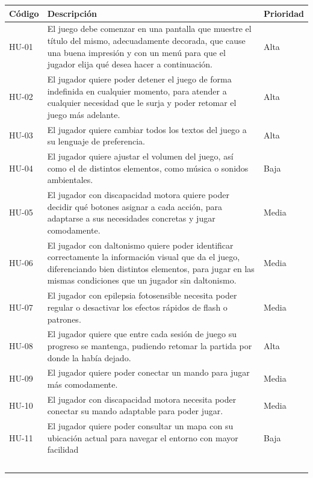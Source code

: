 \begin{table}[H]
    \centering
    \begin{tabular}{|l|p{13cm}|l|}
    \hline
        Código & Descripción & Prioridad \\ \hline
        HU-01 & El juego debe comenzar en una pantalla que muestre el título del mismo, adecuadamente decorada, que cause una buena impresión y con un menú para que el jugador elija qué desea hacer a continuación. & Alta \\ \hline
        HU-02 & El jugador quiere poder detener el juego de forma indefinida en cualquier momento, para atender a cualquier necesidad que le surja y poder retomar el juego más adelante. & Alta \\ \hline
        HU-03 & El jugador quiere cambiar todos los textos del juego a su lenguaje de preferencia. & Alta \\ \hline
        HU-04 & El jugador quiere ajustar el volumen del juego, así como el de distintos elementos, como música o sonidos ambientales. & Baja \\ \hline
        HU-05 & El jugador con discapacidad motora quiere poder decidir qué botones asignar a cada acción, para adaptarse a sus necesidades concretas y jugar comodamente. & Media \\ \hline
        HU-06 & El jugador con daltonismo quiere poder identificar correctamente la información visual que da el juego, diferenciando bien distintos elementos, para jugar en las mismas condiciones que un jugador sin daltonismo. & Media \\ \hline
        HU-07 & El jugador con epilepsia fotosensible necesita poder regular o desactivar los efectos rápidos de flash o patrones. & Media \\ \hline
        HU-08 & El jugador quiere que entre cada sesión de juego su progreso se mantenga, pudiendo retomar la partida por donde la había dejado. & Alta \\ \hline
        HU-09 & El jugador quiere poder conectar un mando para jugar más comodamente. & Media \\ \hline
        HU-10 & El jugador con discapacidad motora necesita poder conectar su mando adaptable para poder jugar. & Media \\ \hline
        HU-11 & El jugador quiere poder consultar un mapa con su ubicación actual para navegar el entorno con mayor facilidad & Baja \\ \hline
        ~ & ~ & ~ \\ \hline

\end{tabular}
\end{table}
